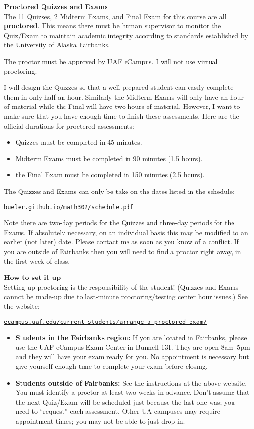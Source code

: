 \documentclass[12pt]{article}
\renewcommand{\emph}[1]{\textsf{\textbf{#1}}}
\newcommand{\localhead}[1]{\par\smallskip\textbf{#1}\nobreak\\}%
\def\heading#1{\localhead{\large\emph{#1}}}
\begin{document}
\phantom{foo}
\cfoot{}


\heading{Proctored Quizzes and Exams}
The 11 Quizzes, 2 Midterm Exams, and Final Exam for this course are all \emph{proctored}.  This means there must be human supervisor to monitor the Quiz/Exam to maintain academic integrity according to standards established by the University of Alaska Fairbanks.

The proctor must be approved by UAF eCampus.  I will not use virtual proctoring.

I will design the Quizzes so that a well-prepared student can easily complete them in only half an hour.  Similarly the Midterm Exams will only have an hour of material while the Final will have two hours of material.  However, I want to make sure that you have enough time to finish these assessments.  Here are the official durations for proctored assessments:
\begin{itemize}
\item Quizzes must be completed in 45 minutes.
\item Midterm Exams must be completed in 90 minutes (1.5 hours).
\item the Final Exam must be completed in 150 minutes (2.5 hours).
\end{itemize}

The Quizzes and Exams can only be take on the dates listed in the schedule:

\centerline{\href{https://bueler.github.io/math302/schedule.pdf}{\tt bueler.github.io/math302/schedule.pdf}}

Note there are two-day periods for the Quizzes and three-day periods for the Exams.  If absolutely necessary, on an individual basis this may be modified to an earlier (not later) date.  Please contact me as soon as you know of a conflict.  If you are outside of Fairbanks then you will need to find a proctor right away, in the first week of class.

\heading{How to set it up}
Setting-up proctoring is the responsibility of the student!  (Quizzes and Exams cannot be made-up due to last-minute proctoring/testing center hour issues.)  See the website:

\medskip
\centerline{\href{https://ecampus.uaf.edu/current-students/arrange-a-proctored-exam/}{\tt ecampus.uaf.edu/current-students/arrange-a-proctored-exam/}}

\begin{itemize}
\item \textbf{Students in the Fairbanks region:}  If you are located in Fairbanks, please use the UAF eCampus Exam Center in Bunnell 131.  They are open 8am--5pm and they will have your exam ready for you.  No appointment is necessary but give yourself enough time to complete your exam before closing.
\item \textbf{Students outside of Fairbanks:}  See the instructions at the above website.  You must identify a proctor at least two weeks in advance.  Don't assume that the next Quiz/Exam will be scheduled just because the last one was; you need to ``request'' each assessment.  Other UA campuses may require appointment times; you may not be able to just drop-in.
\end{itemize}
\end{document}
